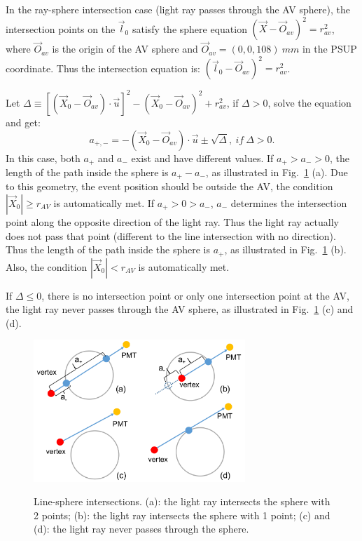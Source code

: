 In the ray-sphere intersection case (light ray passes through the AV sphere), the intersection points on the $\vec{l}_0$ satisfy the sphere equation $(\vec{X}-\vec{O}_{av})^2= r^2_{av}$, where $\vec{O}_{av}$ is the origin of the AV sphere and $\vec{O}_{av} = (0,0,108)~mm$ in the PSUP coordinate. Thus the intersection equation is:
$(\vec{l}_0-\vec{O}_{av})^2 = r^2_{av}$.

Let $\Delta \equiv {[(\vec{X}_0-\vec{O}_{av})\cdot\vec{u}]}^2-{(\vec{X}_0-\vec{O}_{av})}^2+r^2_{av}$, if $\Delta>0$, solve the equation and get:
\begin{equation}\label{eq:ray-sphere}
a_{+,-} = -(\vec{X}_0-\vec{O}_{av})\cdot\vec{u}\pm\sqrt{\Delta},~if~\Delta>0.
\end{equation}
In this case, both $a_+$ and $a_-$ exist and have different values. If $a_+>a_->0$, the length of the path inside the sphere is $a_+-a_-$, as illustrated in Fig.~\ref{line-sphere} (a). Due to this geometry, the event position should be outside the AV, the condition $|\vec{X}_0|\geq r_{AV}$ is automatically met. If $a_+>0>a_-$, $a_-$ determines the intersection point along the opposite direction of the light ray. Thus the light ray actually does not pass that point (different to the line intersection with no direction). Thus the length of the path inside the sphere is $a_+$, as illustrated in Fig.~\ref{line-sphere} (b). Also, the condition $|\vec{X}_0|<r_{AV}$ is automatically met. 

If $\Delta\leq0$,
there is no intersection point or only one intersection point at the AV, the light ray never passes through the AV sphere, as illustrated in Fig.~\ref{line-sphere} (c) and (d).

\begin{figure}
	\centering
{\includegraphics[width=80mm]{line-sphere.png}}
\caption{Line-sphere intersections. (a): the light ray intersects the sphere with 2 points; (b): the light ray intersects the sphere with 1 point; (c) and (d): the light ray never passes through the sphere.}\label{line-sphere}
\end{figure}

